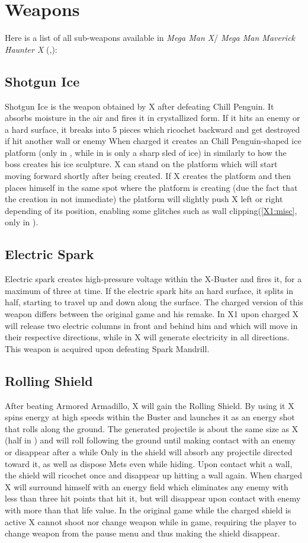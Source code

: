 \section{Weapons}\label{X1:sub_weapon}
Here is a list of all sub-weapons available in\textit{ Mega Man X}/ \textit{Mega Man Maverick Haunter X} (\cite{MHX:manual},\cite{wiki:X_weapons}):
\subsection{Shotgun Ice}\label{Shotgun_ice}
Shotgun Ice is the weapon obtained by X after defeating Chill Penguin. It absorbs moisture in the air and fires it in crystallized form. If it hits an enemy or a hard surface, it breaks into 5 pieces which ricochet backward and get destroyed if hit another wall or enemy When charged it creates an Chill Penguin-shaped ice platform (only in \x, while in \mhx is only a sharp sled of ice) in similarly to how the boss creates his ice sculpture. X can stand on the platform which will start moving forward shortly after being created. If X creates the platform and then places himself in the same spot where the platform is creating (due the fact that the creation in not immediate) the platform will slightly push X left or right depending of its position, enabling some glitches such as wall clipping(\ref{X1:misc}, only in \x).
\subsection{Electric Spark}\label{Electric_spark}
Electric spark creates high-pressure voltage within the X-Buster and fires it, for a maximum of three at time. If the electric spark hits an hard surface, it splits in half, starting to travel up and down along the surface. The charged version of this weapon differs between the original game and his remake. In X1 upon charged X will release two electric columns in front and behind him and which will move in their respective directions, while in \mhx X will generate electricity in all directions. This weapon is acquired upon defeating Spark Mandrill.
\subsection{Rolling Shield}\label{Rolling_shield}
After beating Armored Armadillo, X will gain the Rolling Shield. By using it X spins energy at high speeds within the Buster and launches it	as an energy shot that rolls along the ground. The generated projectile is about the same size as X (half in \mhx) and will roll following the ground until making contact with an enemy or disappear after a while Only in \mhx the shield will absorb any projectile directed toward it, as well as dispose Mets even while hiding\cite{wiki:Rolling_shield}. Upon contact whit a wall, the shield will ricochet once and disappear up hitting a wall again. When charged X will surround himself with an energy field which eliminates any enemy with less than three hit points that hit it, but will disappear upon contact with enemy with more than that life value. In the original game while the charged shield is active X cannot shoot nor change weapon while in game, requiring the player to change weapon from the pause menu and thus making the shield disappear.
